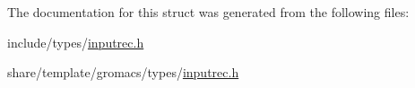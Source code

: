 \-The documentation for this struct was generated from the following files\-:\begin{DoxyCompactItemize}
\item 
include/types/\hyperlink{include_2types_2inputrec_8h}{inputrec.\-h}\item 
share/template/gromacs/types/\hyperlink{share_2template_2gromacs_2types_2inputrec_8h}{inputrec.\-h}\end{DoxyCompactItemize}
